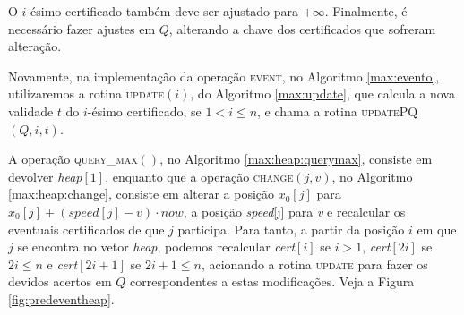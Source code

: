 

O $i$-ésimo certificado também deve ser ajustado para $+\infty$.
Finalmente, é necessário fazer ajustes em $Q$, alterando a chave dos
certificados que sofreram alteração.



Novamente, na implementação da operação \textsc{event}, no Algoritmo
\ref{max:evento}, utilizaremos a rotina \textsc{update}$(i)$, do
Algoritmo \ref{max:update}, que calcula a nova validade $t$ do
$i$-ésimo certificado, se $1 < i \leq n$, e chama a rotina
\textsc{updatePQ}$(Q, i, t)$.





A operação \textsc{query\_max}$()$, no Algoritmo
\ref{max:heap:querymax}, consiste em devolver \textit{heap}$[1]$,
enquanto que a operação \textsc{change}$(j, v)$, no Algoritmo
\ref{max:heap:change}, consiste em alterar a posição $x_0[j]$ para
${x_0[j] + (\mathit{speed}[j] - v)\cdot now}$, a posição
\textit{speed}[j] para \textit{v} e recalcular os eventuais
certificados de que $j$ participa. Para tanto, a partir da posição
$i$ em que $j$ se encontra no vetor \textit{heap}, podemos
recalcular \textit{cert}$[i]$ se $i > 1$, \textit{cert}$[2i]$ se $2i
\leq n$ e \textit{cert}$[2i + 1]$ se $2i + 1 \leq n$, acionando a
rotina \textsc{update} para fazer os devidos acertos em $Q$
correspondentes a estas modificações. Veja a Figura
\ref{fig:predeventheap}.







